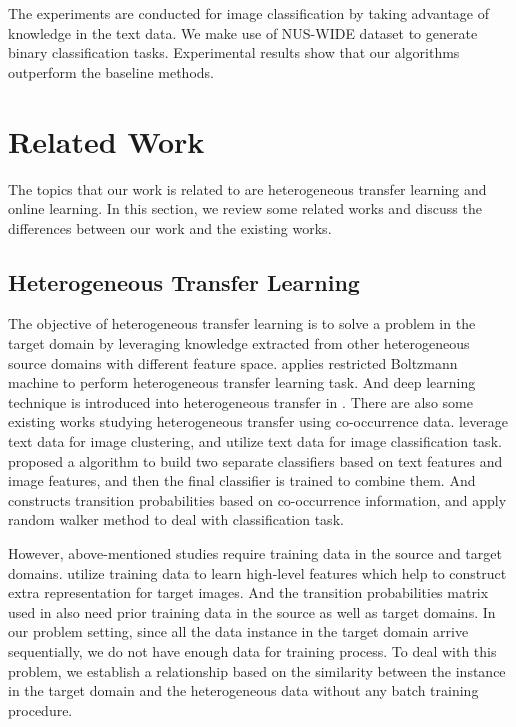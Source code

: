 \documentclass[letterpaper]{article}
\theoremstyle{remark}
\theoremstyle{definition}
\begin{document}
The experiments are conducted for image classification by taking advantage of knowledge in the text data.
We make use of NUS-WIDE dataset to generate binary classification tasks.
Experimental results show that our algorithms outperform the baseline methods.

\section{Related Work}

The topics that our work is related to are heterogeneous transfer learning and online learning.
In this section, we review some related works and discuss the differences between our work and the existing works.

\subsection{Heterogeneous Transfer Learning}
The objective of heterogeneous transfer learning is to solve a problem in the target domain by leveraging knowledge extracted from other heterogeneous source domains with different feature space.
\cite{wei2011heterogeneous} applies restricted Boltzmann machine to perform heterogeneous transfer learning task.
And deep learning technique is introduced into heterogeneous transfer in \cite{zhou2014hybrid}.
There are also some existing works studying heterogeneous transfer using co-occurrence data.
\cite{yang2009heterogeneous} leverage text data for image clustering, and \cite{zhu2011heterogeneous} utilize text data for image classification task.
\cite{wang2009building} proposed a algorithm to build two separate classifiers based on text features and image features, and then the final classifier is trained to combine them.
And \cite{ng2012co,wu2014co,tan2014mixed} constructs transition probabilities based on co-occurrence information, and apply random walker method to deal with classification task.

However, above-mentioned studies require training data in the source and target domains.
\cite{zhu2011heterogeneous} utilize training data to learn high-level features which help to construct extra representation for target images.
And the transition probabilities matrix used in \cite{ng2012co,wu2014co} also need prior training data in the source as well as target domains.
In our problem setting, since all the data instance in the target domain arrive sequentially, we do not have enough data for training process.
To deal with this problem, we establish a relationship based on the similarity between the instance in the target domain and the heterogeneous data without any batch training procedure.
\end{document}
